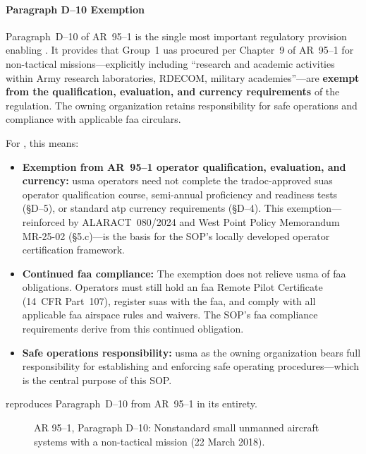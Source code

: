         \paragraph{Paragraph D--10 Exemption} Paragraph~D--10 of AR~95--1 is the single most important regulatory provision enabling \projectmars{}.  It provides that Group~1 \ac{uas} procured per Chapter~9 of AR~95--1 for non-tactical missions---explicitly including ``research and academic activities within Army research laboratories, RDECOM, military academies''---are \textbf{exempt from the qualification, evaluation, and currency requirements} of the regulation.  The owning organization retains responsibility for safe operations and compliance with applicable \ac{faa} circulars.

        For \projectmars{}, this means:
        \begin{itemize}
            \item \textbf{Exemption from AR~95--1 operator qualification, evaluation, and currency:}  \ac{usma} operators need not complete the \ac{tradoc}-approved \ac{suas} operator qualification course, semi-annual proficiency and readiness tests ({\S}D--5), or standard \ac{atp} currency requirements ({\S}D--4).  This exemption---reinforced by ALARACT~080/2024 and West Point Policy Memorandum MR-25-02 ({\S}5.c)---is the basis for the SOP's locally developed operator certification framework.
            \item \textbf{Continued \ac{faa} compliance:} The exemption does not relieve \ac{usma} of \ac{faa} obligations.  Operators must still hold an \ac{faa} Remote Pilot Certificate (14~CFR Part~107), register \ac{suas} with the \ac{faa}, and comply with all applicable \ac{faa} airspace rules and waivers.  The SOP's \ac{faa} compliance requirements derive from this continued obligation.
            \item \textbf{Safe operations responsibility:} \ac{usma} as the owning organization bears full responsibility for establishing and enforcing safe operating procedures---which is the central purpose of this SOP.
        \end{itemize}

         reproduces Paragraph~D--10 from AR~95--1 in its entirety.

        \begin{figure}[htbp]
            \centering
            \caption{AR 95--1, Paragraph D--10: Nonstandard small unmanned aircraft systems with a non-tactical mission (22 March 2018).}
            \label{fig:ar95-1-d10}
        \end{figure}

